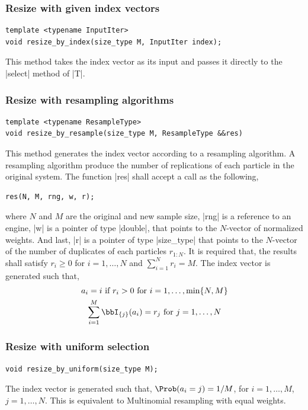 \subsubsection{Resize with given index vectors}

\begin{Verbatim}
template <typename InputIter>
void resize_by_index(size_type M, InputIter index);
\end{Verbatim}
This method takes the index vector as its input and passes it directly to the
|select| method of |T|.

\subsubsection{Resize with resampling algorithms}

\begin{Verbatim}
template <typename ResampleType>
void resize_by_resample(size_type M, ResampleType &&res)
\end{Verbatim}
This method generates the index vector according to a resampling algorithm. A
resampling algorithm produce the number of replications of each particle in the
original system. The function |res| shall accept a call as the following,
\begin{Verbatim}
res(N, M, rng, w, r);
\end{Verbatim}
where $N$ and $M$ are the original and new sample size, |rng| is a reference to
an \rng engine, |w| is a pointer of type |double|, that points to the
$N$-vector of normalized weights. And last, |r| is a pointer of type
|size_type| that points to the $N$-vector of the number of duplicates of each
particles $r_{1:N}$. It is required that, the results shall satisfy $r_i\ge0$
for $i=1,\dots,N$ and $\sum_{i=1}^N r_i = M$. The index vector is generated
such that,
\begin{gather*}
  a_i = i \text{ if } r_i > 0 \text{ for } i = 1,\dots,\min\{N, M\} \\
  \sum_{i=1}^M\bbI_{\{j\}}(a_i) = r_j \text{ for } j = 1,\dots,N
\end{gather*}

\subsubsection{Resize with uniform selection}

\begin{Verbatim}
void resize_by_uniform(size_type M);
\end{Verbatim}
The index vector is generated such that, $\Prob(a_i = j) = 1/M$, for $i =
1,\dots,M$, $j = 1,\dots,N$. This is equivalent to Multinomial resampling with
equal weights.

